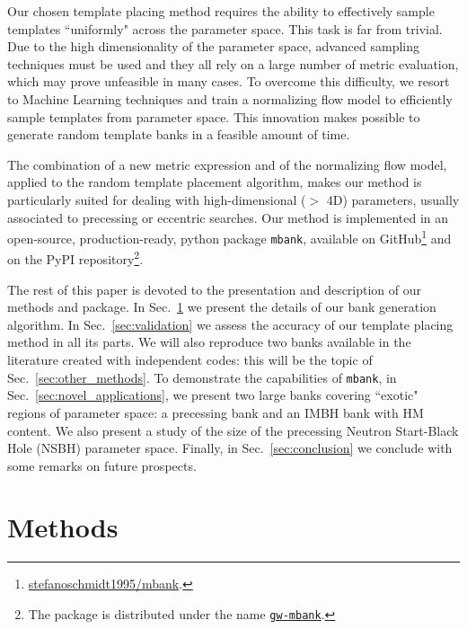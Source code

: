 \documentclass[twocolumn,showpacs,preprintnumbers,nofootinbib,prd,
superscriptaddress,10pt]{revtex4-2}
\begin{document}
Our chosen template placing method requires the ability to effectively sample templates ``uniformly" across the parameter space.
This task is far from trivial. Due to the high dimensionality of the parameter space, advanced sampling techniques must be used and they all rely on a large number of metric evaluation, which may prove unfeasible in many cases. To overcome this difficulty, we resort to Machine Learning techniques and train a normalizing flow model to efficiently sample templates from parameter space. This innovation makes possible to generate random template banks in a feasible amount of time.

The combination of a new metric expression and of the normalizing flow model, applied to the random template placement algorithm, makes our method is particularly suited for dealing with high-dimensional ($>$ 4D) parameters, usually associated to precessing or eccentric searches.
Our method is implemented in an open-source, production-ready, python package \texttt{mbank}, available on GitHub\footnote{
\href{https://github.com/stefanoschmidt1995/mbank}{stefanoschmidt1995/mbank}.}
and on the PyPI repository\footnote{
The package is distributed under the name \texttt{\href{https://pypi.org/project/gw-mbank/}{gw-mbank}}.
}.

The rest of this paper is devoted to the presentation and description of our methods and package.
In Sec.~\ref{sec:methods} we present the details of our bank generation algorithm.
In Sec.~\ref{sec:validation} we assess the accuracy of our template placing method in all its parts.
We will also reproduce two banks available in the literature \cite{Harry:2017weg, Sakon:2022ibh} created with independent codes: this will be the topic of Sec.~\ref{sec:other_methods}.
To demonstrate the capabilities of \texttt{mbank}, in Sec.~\ref{sec:novel_applications}, we present two large banks covering ``exotic" regions of parameter space: a precessing bank and an IMBH bank with HM content. We also present a study of the size of the precessing Neutron Start-Black Hole (NSBH) parameter space.
Finally, in Sec.~\ref{sec:conclusion} we conclude with some remarks on future prospects.

\section{Methods} \label{sec:methods}
\end{document}
